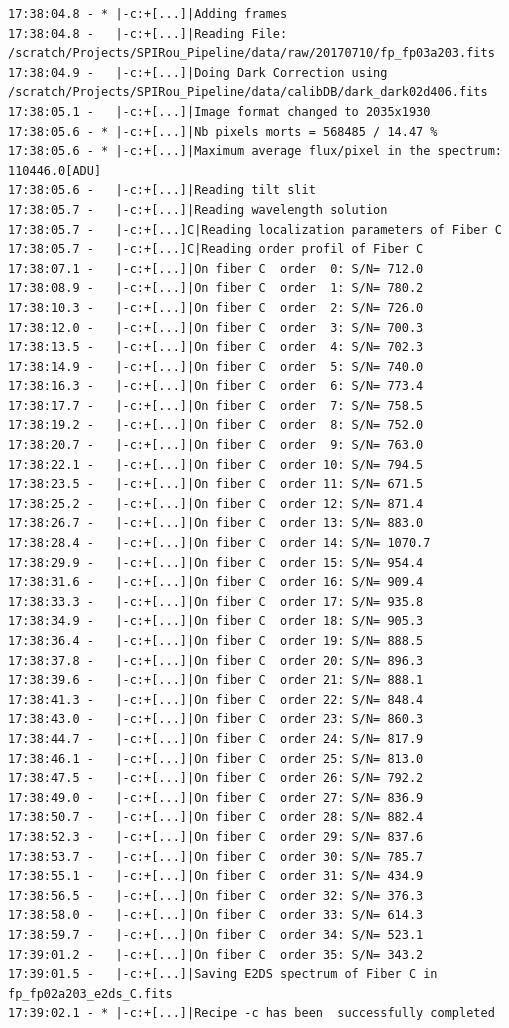 \begin{lstlisting}[style=text]
17:38:04.8 - * |-c:+[...]|Adding frames
17:38:04.8 -   |-c:+[...]|Reading File: /scratch/Projects/SPIRou_Pipeline/data/raw/20170710/fp_fp03a203.fits
17:38:04.9 -   |-c:+[...]|Doing Dark Correction using /scratch/Projects/SPIRou_Pipeline/data/calibDB/dark_dark02d406.fits
17:38:05.1 -   |-c:+[...]|Image format changed to 2035x1930
17:38:05.6 - * |-c:+[...]|Nb pixels morts = 568485 / 14.47 %
17:38:05.6 - * |-c:+[...]|Maximum average flux/pixel in the spectrum: 110446.0[ADU]
17:38:05.6 -   |-c:+[...]|Reading tilt slit 
17:38:05.7 -   |-c:+[...]|Reading wavelength solution 
17:38:05.7 -   |-c:+[...]C|Reading localization parameters of Fiber C
17:38:05.7 -   |-c:+[...]C|Reading order profil of Fiber C
17:38:07.1 -   |-c:+[...]|On fiber C  order  0: S/N= 712.0  
17:38:08.9 -   |-c:+[...]|On fiber C  order  1: S/N= 780.2  
17:38:10.3 -   |-c:+[...]|On fiber C  order  2: S/N= 726.0  
17:38:12.0 -   |-c:+[...]|On fiber C  order  3: S/N= 700.3  
17:38:13.5 -   |-c:+[...]|On fiber C  order  4: S/N= 702.3  
17:38:14.9 -   |-c:+[...]|On fiber C  order  5: S/N= 740.0  
17:38:16.3 -   |-c:+[...]|On fiber C  order  6: S/N= 773.4  
17:38:17.7 -   |-c:+[...]|On fiber C  order  7: S/N= 758.5  
17:38:19.2 -   |-c:+[...]|On fiber C  order  8: S/N= 752.0  
17:38:20.7 -   |-c:+[...]|On fiber C  order  9: S/N= 763.0  
17:38:22.1 -   |-c:+[...]|On fiber C  order 10: S/N= 794.5  
17:38:23.5 -   |-c:+[...]|On fiber C  order 11: S/N= 671.5  
17:38:25.2 -   |-c:+[...]|On fiber C  order 12: S/N= 871.4  
17:38:26.7 -   |-c:+[...]|On fiber C  order 13: S/N= 883.0  
17:38:28.4 -   |-c:+[...]|On fiber C  order 14: S/N= 1070.7  
17:38:29.9 -   |-c:+[...]|On fiber C  order 15: S/N= 954.4  
17:38:31.6 -   |-c:+[...]|On fiber C  order 16: S/N= 909.4
17:38:33.3 -   |-c:+[...]|On fiber C  order 17: S/N= 935.8
17:38:34.9 -   |-c:+[...]|On fiber C  order 18: S/N= 905.3
17:38:36.4 -   |-c:+[...]|On fiber C  order 19: S/N= 888.5
17:38:37.8 -   |-c:+[...]|On fiber C  order 20: S/N= 896.3
17:38:39.6 -   |-c:+[...]|On fiber C  order 21: S/N= 888.1
17:38:41.3 -   |-c:+[...]|On fiber C  order 22: S/N= 848.4
17:38:43.0 -   |-c:+[...]|On fiber C  order 23: S/N= 860.3
17:38:44.7 -   |-c:+[...]|On fiber C  order 24: S/N= 817.9
17:38:46.1 -   |-c:+[...]|On fiber C  order 25: S/N= 813.0
17:38:47.5 -   |-c:+[...]|On fiber C  order 26: S/N= 792.2
17:38:49.0 -   |-c:+[...]|On fiber C  order 27: S/N= 836.9
17:38:50.7 -   |-c:+[...]|On fiber C  order 28: S/N= 882.4
17:38:52.3 -   |-c:+[...]|On fiber C  order 29: S/N= 837.6
17:38:53.7 -   |-c:+[...]|On fiber C  order 30: S/N= 785.7
17:38:55.1 -   |-c:+[...]|On fiber C  order 31: S/N= 434.9
17:38:56.5 -   |-c:+[...]|On fiber C  order 32: S/N= 376.3
17:38:58.0 -   |-c:+[...]|On fiber C  order 33: S/N= 614.3
17:38:59.7 -   |-c:+[...]|On fiber C  order 34: S/N= 523.1
17:39:01.2 -   |-c:+[...]|On fiber C  order 35: S/N= 343.2
17:39:01.5 -   |-c:+[...]|Saving E2DS spectrum of Fiber C in fp_fp02a203_e2ds_C.fits
17:39:02.1 - * |-c:+[...]|Recipe -c has been  successfully completed
\end{lstlisting}

